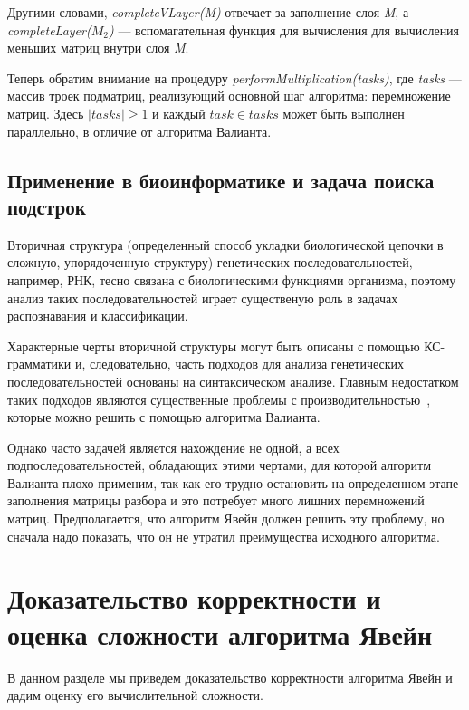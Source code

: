 \documentclass[14pt]{matmex-diploma-custom}
\begin{document}
Другими словами, \textit{completeVLayer(M)} отвечает за заполнение слоя \textit{M}, а \textit{completeLayer($M_{2}$)} --- вспомагательная функция для вычисления для вычисления меньших матриц внутри слоя \textit{M}.

Теперь обратим внимание на процедуру \textit{performMultiplication(tasks)}, где \textit{tasks} --- массив троек подматриц, реализующий основной шаг алгоритма: перемножение матриц.
Здесь $|tasks| \ge 1$ и каждый $task \in tasks$ может быть выполнен параллельно, в отличие от алгоритма Валианта.

\subsection{Применение в биоинформатике и задача поиска подстрок}

Вторичная структура (определенный способ укладки биологической цепочки в сложную, упорядоченную структуру) генетических последовательностей, например, РНК, тесно связана с биологическими функциями организма, поэтому анализ таких последовательностей играет существеную роль в задачах распознавания и классификации.

Характерные черты вторичной структуры могут быть описаны с помощью КС-грамматики и, следовательно, часть подходов для анализа генетических последовательностей основаны на синтаксическом анализе. Главным недостатком таких подходов являются существенные проблемы с производительностью~\cite{durbin1996biological}, которые можно решить с помощью алгоритма Валианта.

Однако часто задачей является нахождение не одной, а всех подпоследовательностей, обладающих этими чертами, для которой алгоритм Валианта плохо применим,  так как его трудно остановить на определенном этапе заполнения матрицы разбора и это потребует много лишних перемножений матриц. 
Предполагается, что алгоритм Явейн должен решить эту проблему, но сначала надо показать, что он не утратил преимущества исходного алгоритма.

\section{Доказательство корректности и оценка сложности алгоритма Явейн}

В данном разделе мы приведем доказательство корректности алгоритма Явейн и дадим оценку его вычислительной сложности.
\end{document}
